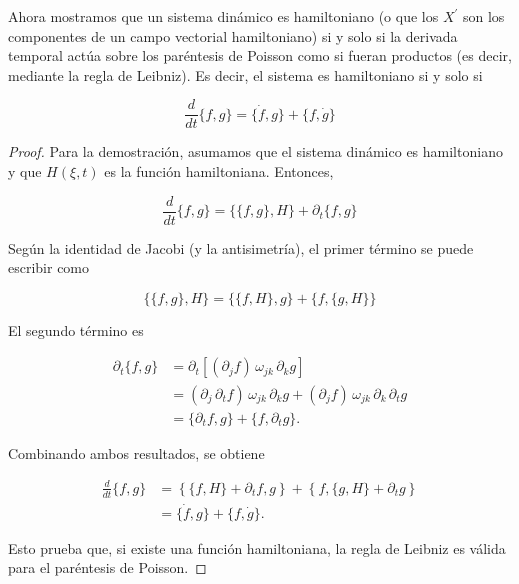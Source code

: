 \begin{proposition}
  Ahora mostramos que un sistema dinámico es hamiltoniano (o que los \(X^{\prime}\) son los componentes de un campo vectorial hamiltoniano) si y solo si la derivada temporal actúa sobre los paréntesis de Poisson como si fueran productos (es decir, mediante la regla de Leibniz). Es decir, el sistema es hamiltoniano si y solo si

\[
\frac{d}{d t}\{f, g\} = \{\dot{f}, g\} + \{f, \dot{g}\} \tag{5.62}
\]

\end{proposition}
\begin{proof}
  Para la demostración, asumamos que el sistema dinámico es hamiltoniano y que \( H(\xi, t) \) es la función hamiltoniana. Entonces,

\[
\frac{d}{d t}\{f, g\} = \{\{f, g\}, H\} + \partial_{t}\{f, g\}
\]

Según la identidad de Jacobi (y la antisimetría), el primer término se puede escribir como

\[
\{\{f, g\}, H\} = \{\{f, H\}, g\} + \{f, \{g, H\}\}
\]

El segundo término es

\[
\begin{aligned}
\partial_{t}\{f, g\} & = \partial_{t}\left[(\partial_j f) \, \omega_{j k} \, \partial_k g\right] \\
& = (\partial_j \, \partial_{t} f) \, \omega_{j k} \, \partial_k g + (\partial_j f) \, \omega_{j k} \, \partial_k \, \partial_{t} g \\
& = \{\partial_{t} f, g\} + \{f, \partial_{t} g\}.
\end{aligned}
\]

Combinando ambos resultados, se obtiene

\[
\begin{aligned}
\frac{d}{d t}\{f, g\} &= \left\{\{f, H\} + \partial_{t} f, g\right\} + \left\{f, \{g, H\} + \partial_{t} g\right\} \\
&= \{\dot{f}, g\} + \{f, \dot{g}\}.
\end{aligned}
\]

Esto prueba que, si existe una función hamiltoniana, la regla de Leibniz es válida para el paréntesis de Poisson.
\end{proof}

